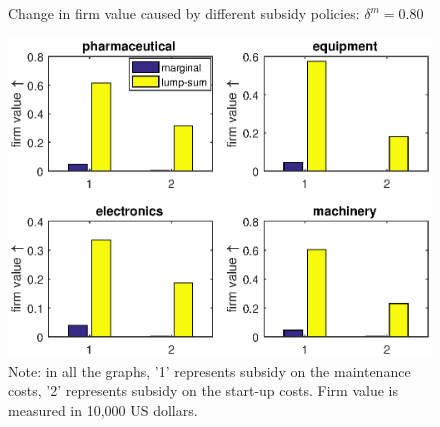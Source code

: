 \documentclass[English]{article}
\begin{document}
\begin{center}
\begin{figure}[H]
\caption{Change in firm value caused by different subsidy policies: $\delta^m=0.80$}
\label{F6}
\begin{centering}
\includegraphics[width=1\textwidth]{FirmvalueChange.eps}
\par\end{centering}
\caption*{\small{}Note: in all the graphs, '1' represents subsidy on the maintenance costs, '2' represents subsidy on the start-up costs. Firm value is measured in 10,000 US dollars.}{\small \par}
\end{figure}
\par\end{center}
\end{document}
